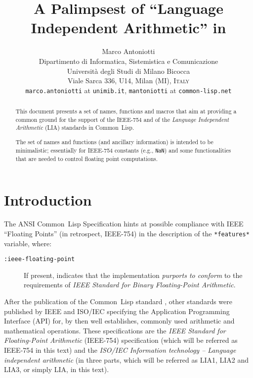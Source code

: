 \documentclass[10pt,fleqn]{article}
\title{
\LARGE{\bfseries A Palimpsest of ``Language Independent Arithmetic'' in \CL{}}}
\author{
  Marco Antoniotti\\
  Dipartimento di Informatica, Sistemistica e Comunicazione\\
  Universit\`{a} degli Studi di Milano Bicocca\\
  Viale Sarca 336, U14, Milan (MI), \textsc{Italy}\\
  \vspace{2mm}
  \texttt{marco.antoniotti} at \texttt{unimib.it},
  \texttt{mantoniotti} at \texttt{common-lisp.net}}
\newcommand{\CL}{\textsf{Common~Lisp}}
\newcommand{\code}[1]{\texttt{#1}}
\newcommand{\IEEEFPStd}{IEEE-754}
\begin{document}
\maketitle

\begin{abstract}
  This document presents a set of names, functions and macros that aim
  at providing a common ground for the support of the \IEEEFPStd{}
  \cite{2008:IEEE-754} and of the \emph{Language Independent
    Arithmetic} (LIA) standards \cite{2012:LIA1,2001:LIA2,2004:LIA3}
  in \CL{}.

  The set of names and functions (and ancillary information) is
  intended to be minimalistic; essentially for \IEEEFPStd{} constants
  (e.g., \code{NaN}) and some functionalities that are needed to
  control floating point computations.
\end{abstract}

\newpage

\tableofcontents

\newpage

\section{Introduction}

The ANSI \CL{} Specification \cite{1996:ANSIHyperSpec} hints at possible
compliance with IEEE ``Floating Points'' (in retrospect, \IEEEFPStd{}) in
the description of the \code{*features*} variable, where:
\begin{description}
\item[\code{:ieee-floating-point}]
  If present, indicates that the
  implementation \emph{purports to conform}  to the requirements of
  \emph{IEEE Standard for Binary Floating-Point Arithmetic}. 
\end{description}

After the publication of the \CL{} standard \cite{1994:ANSICL}, other
standards were published by IEEE and ISO/IEC specifying the
Application Programming Interface (API) for, by then well establishes,
commonly used arithmetic and mathematical operations.  These
specifications are the \emph{IEEE Standard for Floating-Point
  Arithmetic} (\IEEEFPStd{}) \cite{2008:IEEE-754} specification (which
will be referred as \IEEEFPStd{} in this text) and the \emph{ISO/IEC
  Information technology -- Language independent arithmetic}
\cite{2012:LIA1,2001:LIA2,2004:LIA3} (in three parts, which will be
referred as LIA1, LIA2 and LIA3, or simply LIA, in this text).
\end{document}
